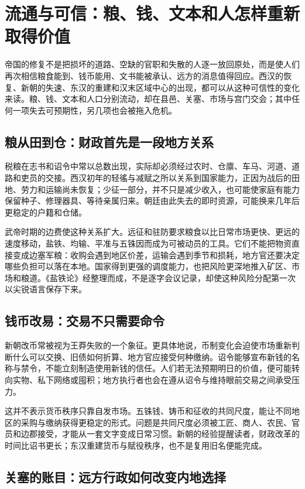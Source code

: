 \section{流通与可信：粮、钱、文本和人怎样重新取得价值}
\label{sec:synthesis-circulation-credibility}

帝国的修复不是把损坏的道路、空缺的官职和失散的人逐一放回原处，而是使人们再次相信粮食能到、钱币能用、文书能被承认、远方的消息值得回应。西汉的恢复、新朝的失速、东汉的重建和汉末区域中心的出现，都可以从这种可信性的变化来读。粮、钱、文本和人口分别流动，却在县邑、关塞、市场与宫门交会；其中任何一项失去可预期性，另几项也会被拖入危机。

\subsection{粮从田到仓：财政首先是一段地方关系}

税粮在志书和诏令中常以总数出现，实际却必须经过农时、仓廪、车马、河道、道路和吏员的交接。西汉初年的轻徭与减赋之所以关系到国家能力，正因为战后的田地、劳力和运输尚未恢复；少征一部分，并不只是减少收入，也可能使家庭有能力保留种子、修理器具、等待亲属归来。朝廷由此失去的即时资源，可能换来几年后更稳定的户籍和仓储。

武帝时期的边费使这种关系扩大。远征和驻防要求粮食以比日常市场更快、更远的速度移动，盐铁、均输、平准与五铢因而成为可被动员的工具。它们不能把物资直接变成边塞军粮：收购会遇到地区价差，运输会遇到季节和损耗，地方官还要决定哪些负担可以落在本地。国家得到更强的调度能力，也把风险更深地推入矿区、市场和粮道。《盐铁论》经整理而成，不是逐字会议记录，却使这种风险分配第一次以尖锐语言保存下来。

\subsection{钱币改易：交易不只需要命令}

新朝改币常被视为王莽失败的一个象征。更具体地说，币制变化会迫使市场重新判断什么可以交换、旧债如何折算、地方官应接受何种缴纳。诏令能够宣布新钱的名称与禁令，不能立刻制造使用新钱的信任。人们若无法预期明日的价值，便可能转向实物、私下网络或囤积；地方执行者也会在遵从诏令与维持眼前交易之间承受压力。

这并不表示货币秩序只靠自发市场。五铢钱、铸币和征收的共同尺度，能让不同地区的采购与缴纳获得更稳定的形式。问题是共同尺度必须被工匠、商人、农民、官员和边郡接受，才能从一套文字变成日常习惯。新朝的经验提醒读者，财政改革的时间比诏书更长；东汉重建货币与赋役秩序，也不是复用旧名便能完成。

\subsection{关塞的账目：远方行政如何改变内地选择}

